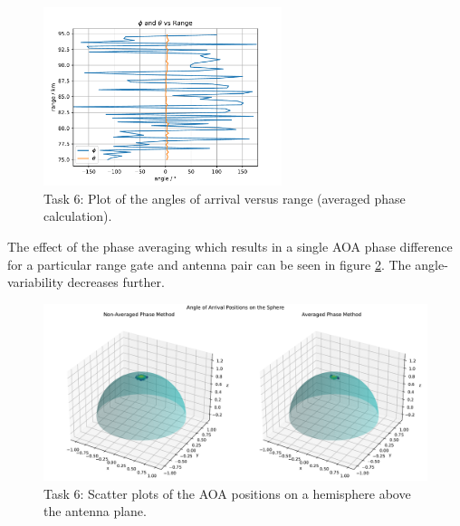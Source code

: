 \begin{figure}
    \begin{center}
        \includegraphics[width=0.62\textwidth]{graphics/t6/t6_aoa_range.pdf}
    \end{center}
    \caption{Task 6: Plot of the angles of arrival versus range (averaged phase calculation).}
    \label{fig:t6-aoa-range}
\end{figure}

The effect of the phase averaging which results in a single AOA phase difference for a particular range gate and antenna pair can be seen in figure \ref{fig:t6-sphere}. The angle-variability decreases further.

\begin{figure}
    \begin{center}
        \includegraphics[width=\textwidth]{graphics/t6/t6_sphere_scatter.pdf}
    \end{center}
    \caption{Task 6: Scatter plots of the AOA positions on a hemisphere above the antenna plane.}
    \label{fig:t6-sphere}
\end{figure}
